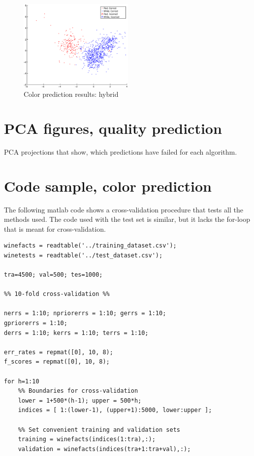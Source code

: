 \documentclass[twoside]{article}
\begin{document}
\begin{multicols}{2}
\begin{figure}[H]
\centering
\includegraphics[width=0.5\textwidth]{colorpca/cvv2f_f}
\caption{Color prediction results: hybrid}
\end{figure}

\section{PCA figures, quality prediction}\label{appendix:qualitypcakuvet}
PCA projections that show, which predictions have failed for each algorithm.


\section{Code sample, color prediction}\label{appendix:colorcode}

The following matlab code shows a cross-validation procedure
that tests all the methods used. The code used with the test
set is similar, but it lacks the for-loop that is meant for 
cross-validation.

{\footnotesize

\begin{verbatim}
winefacts = readtable('../training_dataset.csv');
winetests = readtable('../test_dataset.csv');

tra=4500; val=500; tes=1000;

%% 10-fold cross-validation %%

nerrs = 1:10; npriorerrs = 1:10; gerrs = 1:10; 
gpriorerrs = 1:10;
derrs = 1:10; kerrs = 1:10; terrs = 1:10;

err_rates = repmat([0], 10, 8); 
f_scores = repmat([0], 10, 8); 

for h=1:10
    %% Boundaries for cross-validation
    lower = 1+500*(h-1); upper = 500*h;
    indices = [ 1:(lower-1), (upper+1):5000, lower:upper ];

    %% Set convenient training and validation sets
    training = winefacts(indices(1:tra),:);
    validation = winefacts(indices(tra+1:tra+val),:);


\end{verbatim}}
\end{multicols}
\end{document}
